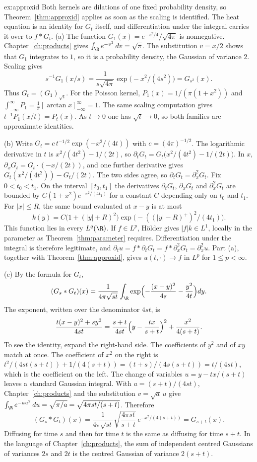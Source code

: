 \begin{solution}{ex:approxid}
\idea Both kernels are dilations of one fixed probability density, so Theorem~\ref{thm:approxid} applies as soon as the scaling is identified. The heat equation is an identity for $G_t$ itself, and differentiation under the integral carries it over to $f*G_t$.
\writeup (a) The function $G_1(x)=e^{-x^2/4}/\sqrt{4\pi}$ is nonnegative. Chapter~\ref{ch:products} gives $\int_\R e^{-v^2}\,dv=\sqrt\pi$. The substitution $v=x/2$ shows that $G_1$ integrates to $1$, so it is a probability density, the Gaussian of variance $2$. Scaling gives
\[s^{-1}G_1(x/s)=\frac1{s\sqrt{4\pi}}\exp\bigl(-x^2/(4s^2)\bigr)=G_{s^2}(x).\]
Thus $G_t=(G_1)_{\sqrt t}$. For the Poisson kernel, $P_1(x)=1/(\pi(1+x^2))$ and $\int_{-\infty}^\infty P_1=\frac1\pi[\arctan x]_{-\infty}^\infty=1$. The same scaling computation gives $t^{-1}P_1(x/t)=P_t(x)$. As $t\to0$ one has $\sqrt t\to0$, so both families are approximate identities.

(b) Write $G_t=c\,t^{-1/2}\exp(-x^2/(4t))$ with $c=(4\pi)^{-1/2}$. The logarithmic derivative in $t$ is $x^2/(4t^2)-1/(2t)$, so $\partial_tG_t=G_t\bigl(x^2/(4t^2)-1/(2t)\bigr)$. In $x$, $\partial_xG_t=G_t\cdot(-x/(2t))$, and one further derivative gives $G_t(x^2/(4t^2))-G_t/(2t)$. The two sides agree, so $\partial_tG_t=\partial_x^2G_t$. Fix $0<t_0<t_1$. On the interval $[t_0,t_1]$ the derivatives $\partial_tG_t$, $\partial_xG_t$ and $\partial_x^2G_t$ are bounded by $C(1+x^2)e^{-x^2/(4t_1)}$ for a constant $C$ depending only on $t_0$ and $t_1$. For $|x|\le R$, the same bound evaluated at $x-y$ is at most
\[k(y)=C\bigl(1+(|y|+R)^2\bigr)\exp\bigl(-((|y|-R)^+)^2/(4t_1)\bigr).\]
This function lies in every $L^q(\R)$. If $f\in L^p$, Hölder gives $|f|k\in L^1$, locally in the parameter as Theorem~\ref{thm:parameter} requires. Differentiation under the integral is therefore legitimate, and $\partial_tu=f*\partial_tG_t=f*\partial_x^2G_t=\partial_x^2u$. Part (a), together with Theorem~\ref{thm:approxid}, gives $u(t,\cdot)\to f$ in $L^p$ for $1\le p<\infty$.

(c) By the formula for $G_t$,
\[(G_s*G_t)(x)=\frac1{4\pi\sqrt{st}}\int_\R\exp\Bigl(-\frac{(x-y)^2}{4s}-\frac{y^2}{4t}\Bigr)dy.\]
The exponent, written over the denominator $4st$, is
\[\frac{t(x-y)^2+sy^2}{4st}=\frac{s+t}{4st}\Bigl(y-\frac{tx}{s+t}\Bigr)^2+\frac{x^2}{4(s+t)}.\]
To see the identity, expand the right-hand side. The coefficients of $y^2$ and of $xy$ match at once. The coefficient of $x^2$ on the right is $t^2/(4st(s+t))+1/(4(s+t))=(t+s)/(4s(s+t))=t/(4st)$, which is the coefficient on the left. The change of variables $u=y-tx/(s+t)$ leaves a standard Gaussian integral. With $a=(s+t)/(4st)$, Chapter~\ref{ch:products} and the substitution $v=\sqrt a\,u$ give $\int_\R e^{-au^2}\,du=\sqrt{\pi/a}=\sqrt{4\pi st/(s+t)}$. Therefore
\[(G_s*G_t)(x)=\frac1{4\pi\sqrt{st}}\sqrt{\frac{4\pi st}{s+t}}\,e^{-x^2/(4(s+t))}=G_{s+t}(x).\]
Diffusing for time $s$ and then for time $t$ is the same as diffusing for time $s+t$. In the language of Chapter~\ref{ch:products}, the sum of independent centred Gaussians of variances $2s$ and $2t$ is the centred Gaussian of variance $2(s+t)$.
\end{solution}

